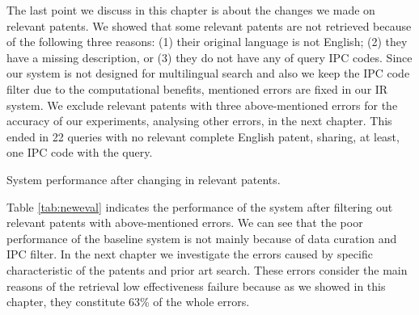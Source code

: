 The last point we discuss in this chapter is about the changes we made on relevant patents. We showed that
some relevant patents are not retrieved because of the following three reasons: (1) their original language is not English; (2) they have a missing description, or (3) they do not have any of query IPC codes. 
Since our system is not designed for multilingual search and also we keep the IPC code filter due to the computational benefits, 
mentioned errors are fixed in our IR system. 
We exclude relevant patents with three above-mentioned errors for the accuracy of our experiments, analysing other errors, in the next chapter. This ended in 22 queries with no relevant complete English patent, sharing, at least, one IPC code with the query.  
\begin{table}[t!]
  \begin{center}
   \caption{System performance after changing in relevant patents.}
     
  \label{tab:neweval}
  \end{center}  
\end{table}
\FloatBarrier

Table \ref{tab:neweval} indicates the performance of the system after filtering out relevant patents with above-mentioned errors. We can see that the poor performance of the baseline system is not mainly because of data curation and IPC filter. In the next chapter we investigate the errors caused by specific characteristic of the patents and prior art search. These errors consider the main reasons of the retrieval low effectiveness failure because as we showed in this chapter, they constitute 63\% of the whole errors. 
%
